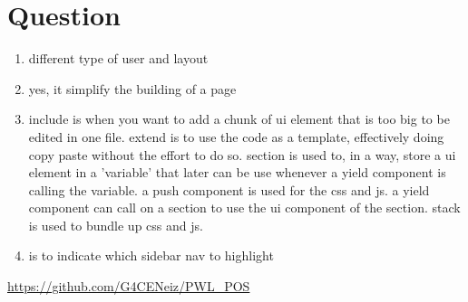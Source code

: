 \documentclass[12pt,titlepage]{article}
\begin{document}
\section*{Question}
\begin{enumerate}
    \item different type of user and layout
    \item yes, it simplify the building of a page
    \item include is when you want to add a chunk of ui element that is too big to be edited in one file. extend is to use the code as a template, effectively doing copy paste without the effort to do so. section is used to, in a way, store a ui element in a 'variable' that later can be use whenever a yield component is calling the variable. a push component is used for the css and js. a yield component can call on a section to use the ui component of the section. stack is used to bundle up css and js.
    \item is to indicate which sidebar nav to highlight
\end{enumerate}

\url{https://github.com/G4CENeiz/PWL_POS}
\end{document}
